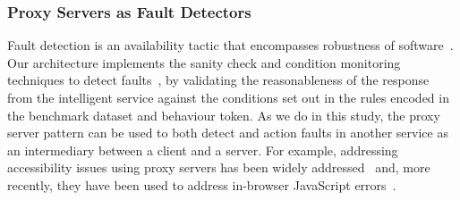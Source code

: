 \subsubsection{Proxy Servers as Fault Detectors}
Fault detection is an availability tactic that encompasses robustness of software~\citep{Bass:2003wi}. Our architecture implements the sanity check and condition monitoring techniques to detect faults~\citep{Bass:2003wi,Ingeno:2018}, by validating the reasonableness of the response from the intelligent service against the conditions set out in the rules encoded in the benchmark dataset and behaviour token. As we do in this study, the proxy server pattern can be used to both detect and action faults in another service as an intermediary between a client and a server. For example, addressing accessibility issues using proxy servers has been widely addressed~\citep{Zhang:2017,Takagi2000,Bigham2006,Bigham2008} and, more recently, they have been used to address in-browser JavaScript errors~\citep{Durieux2018}.




